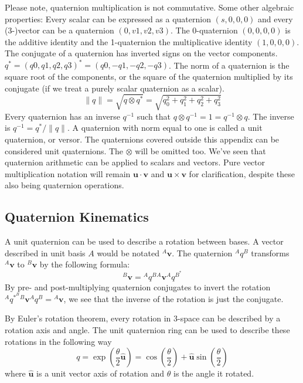 \documentclass[lettersize,journal]{IEEEtran}
\begin{document}
Please note, quaternion multiplication is not commutative. Some other algebraic properties:
Every scalar can be expressed as a quaternion $(s, 0, 0, 0)$ and every (3-)vector can be a quaternion $(0, v1, v2, v3)$. The 0-quaternion $(0, 0, 0, 0)$ is the additive identity and the 1-quaternion the multiplicative identity $(1, 0, 0, 0)$. The conjugate of a quaternion has inverted signs on the vector components. $q^*=(q0, q1, q2, q3)^*=(q0, -q1, -q2, -q3)$. The norm of a quaternion is the square root of the components, or the square of the quaternion multiplied by its conjugate (if we treat a purely scalar quaternion as a scalar).
\begin{equation}
  \|q\| = \sqrt{q\otimes q^*} = \sqrt{q_0^2+q_1^2+q_2^2+q_3^2}
\end{equation}
Every quaternion has an inverse $q^{-1}$ such that $q\otimes q^{-1}=1=q^{-1}\otimes q$. The inverse is $q^{-1}=q^*/\|q\|$. A quaternion with norm equal to one is called a unit quaternion, or versor. The quaternions covered outside this appendix can be considered unit quaternions. The $\otimes$ will be omitted too. We've seen that quaternion arithmetic can be applied to scalars and vectors. Pure vector multiplication notation will remain $\mathbf{u}\cdot\mathbf{v}$ and $\mathbf{u}\times\mathbf{v}$ for clarification, despite these also being quaternion operations.

\subsection{Quaternion Kinematics}
A unit quaternion can be used to describe a rotation between bases. A vector described in unit basis $A$ would be notated $^A\mathbf{v}$. The quaternion $^Aq^B$ transforms $^A\mathbf{v}$ to $^B\mathbf{v}$ by the following formula:
\begin{equation}
  {^B\mathbf{v}} = {^Aq^B} {^A\mathbf{v}} {^Aq^B^*}
\end{equation}
By pre- and post-multiplying quaternion conjugates to invert the rotation ${^Aq^*^B}{^B\mathbf{v}}{^Aq^B}={^A\mathbf{v}}$, we see that the inverse of the rotation is just the conjugate.

By Euler's rotation theorem, every rotation in 3-space can be described by a rotation axis and angle. The unit quaternion ring can be used to describe these rotations in the following way
\begin{equation}
  q = \exp\left(\frac{\theta}{2}\hat{\mathbf{u}}\right) = \cos\left(\frac{\theta}{2}\right) + \hat{\mathbf{u}} \sin\left( \frac{\theta}{2}\right)
\end{equation}
where $\hat{\mathbf{u}}$ is a unit vector axis of rotation and $\theta$ is the angle it rotated.
\end{document}
